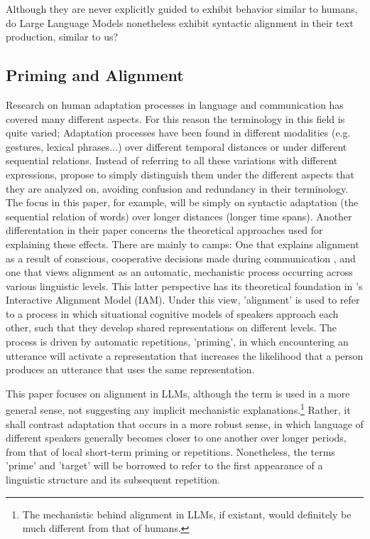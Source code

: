 \documentclass[11pt]{article}
\begin{document}
Although they are never explicitly guided to exhibit behavior similar to humans, do Large Language Models nonetheless exhibit syntactic alignment in their text production, similar to us?

\subsection{Priming and Alignment}
Research on human adaptation processes in language and communication has covered many different aspects. For this reason the terminology in this field is quite varied; Adaptation processes have been found in different modalities (e.g. gestures, lexical phrases...) over different temporal distances or under different sequential relations.
Instead of referring to all these variations with different expressions, \citealp{Rasenberg2020framework} propose to simply distinguish them under the different aspects that they are analyzed on, avoiding confusion and redundancy in their terminology. The focus in this paper, for example, will be simply on syntactic adaptation (the sequential relation of words) over longer distances (longer time spans). Another differentation in their paper concerns the theoretical approaches used for explaining these effects. There are mainly to camps: One that explains alignment as a result of conscious, cooperative decisions made during communication \cite{brennan1996conceptual_pacts}, and one that views alignment as an automatic, mechanistic process occurring across various linguistic levels. This latter perspective has its theoretical foundation in \citealp{Pickering_Garrod_2004}'s Interactive Alignment Model (IAM). Under this view, 'alignment' is used to refer to a process in which situational cognitive models of speakers approach each other, such that they develop shared representations on different levels. The process is driven by automatic repetitions, 'priming', in which encountering an utterance will activate a representation that increases the likelihood that a person produces an utterance that uses the same representation.

This paper focuses on alignment in LLMs, although the term is used in a more general sense, not suggesting any implicit mechanistic explanations.\footnote{The mechanistic behind alignment in LLMs, if existant, would definitely be much different from that of humans.} Rather, it shall contrast adaptation that occurs in a more robust sense, in which language of different speakers generally becomes closer to one another over longer periods, from that of local short-term priming or repetitions.
Nonetheless, the terms 'prime' and 'target' will be borrowed to refer to the first appearance of a linguistic structure and its subsequent repetition.
\end{document}
